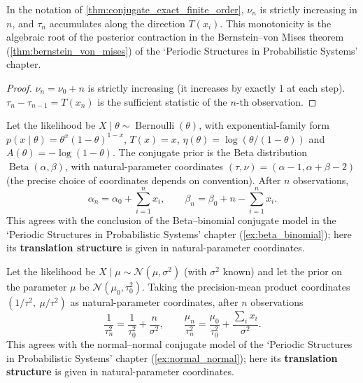 \begin{corollary}\label{cor:natural_parameter_monotone}
In the notation of \cref{thm:conjugate_exact_finite_order}, $\nu_n$ is strictly increasing in $n$, and $\tau_n$ accumulates along the direction $T(x_i)$. This monotonicity is the algebraic root of the posterior contraction in the Bernstein--von Mises theorem (\cref{thm:bernstein_von_mises}) of the `Periodic Structures in Probabilistic Systems' chapter.
\end{corollary}

\begin{proof}
$\nu_n = \nu_0+n$ is strictly increasing (it increases by exactly $1$ at each step). $\tau_n - \tau_{n-1} = T(x_n)$ is the sufficient statistic of the $n$-th observation.
\end{proof}

\begin{example}\label{ex:beta_binomial_exact}
Let the likelihood be $X\mid\theta\sim\operatorname{Bernoulli}(\theta)$, with exponential-family form $p(x\mid\theta) = \theta^x(1-\theta)^{1-x}$, $T(x)=x$, $\eta(\theta) = \log(\theta/(1-\theta))$ and $A(\theta) = -\log(1-\theta)$. The conjugate prior is the Beta distribution $\operatorname{Beta}(\alpha,\beta)$, with natural-parameter coordinates $(\tau,\nu) = (\alpha-1, \alpha+\beta-2)$ (the precise choice of coordinates depends on convention). After $n$ observations,
\[
\alpha_n = \alpha_0 + \sum_{i=1}^n x_i, \qquad \beta_n = \beta_0 + n - \sum_{i=1}^n x_i.
\]
This agrees with the conclusion of the Beta--binomial conjugate model in the `Periodic Structures in Probabilistic Systems' chapter (\cref{ex:beta_binomial}); here its \textbf{translation structure} is given in natural-parameter coordinates.
\end{example}

\begin{example}\label{ex:gaussian_gaussian_exact}
Let the likelihood be $X\mid\mu\sim\mathcal{N}(\mu,\sigma^2)$ (with $\sigma^2$ known) and let the prior on the parameter $\mu$ be $\mathcal{N}(\mu_0,\tau_0^2)$. Taking the precision-mean product coordinates $(1/\tau^2,\ \mu/\tau^2)$ as natural-parameter coordinates, after $n$ observations
\[
\frac{1}{\tau_n^2} = \frac{1}{\tau_0^2} + \frac{n}{\sigma^2}, \qquad \frac{\mu_n}{\tau_n^2} = \frac{\mu_0}{\tau_0^2} + \frac{\sum_i x_i}{\sigma^2}.
\]
This agrees with the normal--normal conjugate model of the `Periodic Structures in Probabilistic Systems' chapter (\cref{ex:normal_normal}); here its \textbf{translation structure} is given in natural-parameter coordinates.
\end{example}

